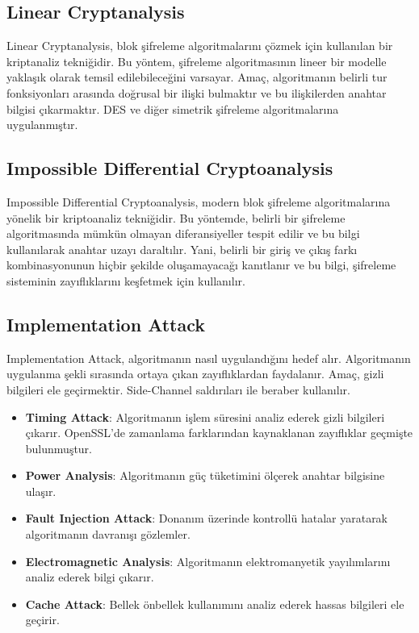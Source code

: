 \newpage

\subsection{Linear Cryptanalysis}

Linear Cryptanalysis, blok şifreleme algoritmalarını çözmek için kullanılan bir kriptanaliz tekniğidir. Bu yöntem, şifreleme algoritmasının lineer bir modelle yaklaşık olarak temsil edilebileceğini varsayar. Amaç, algoritmanın belirli tur fonksiyonları arasında doğrusal bir ilişki bulmaktır ve bu ilişkilerden anahtar bilgisi çıkarmaktır. DES ve diğer simetrik şifreleme algoritmalarına uygulanmıştır.

\newpage

\subsection{Impossible Differential Cryptoanalysis}

Impossible Differential Cryptoanalysis, modern blok şifreleme algoritmalarına yönelik bir kriptoanaliz tekniğidir. Bu yöntemde, belirli bir şifreleme algoritmasında mümkün olmayan diferansiyeller tespit edilir ve bu bilgi kullanılarak anahtar uzayı daraltılır. Yani, belirli bir giriş ve çıkış farkı kombinasyonunun hiçbir şekilde oluşamayacağı kanıtlanır ve bu bilgi, şifreleme sisteminin zayıflıklarını keşfetmek için kullanılır.

\newpage

\subsection{Implementation Attack}

Implementation Attack, algoritmanın nasıl uygulandığını hedef alır. Algoritmanın uygulanma şekli sırasında ortaya çıkan zayıflıklardan faydalanır. Amaç, gizli bilgileri ele geçirmektir. Side-Channel saldırıları ile beraber kullanılır. 

\begin{itemize}
    \item \textbf{Timing Attack}: Algoritmanın işlem süresini analiz ederek gizli bilgileri çıkarır. OpenSSL'de zamanlama farklarından kaynaklanan zayıflıklar geçmişte bulunmuştur.
    \item \textbf{Power Analysis}: Algoritmanın güç tüketimini ölçerek anahtar bilgisine ulaşır.
    \item \textbf{Fault Injection Attack}: Donanım üzerinde kontrollü hatalar yaratarak algoritmanın davranışı gözlemler.
    \item \textbf{Electromagnetic Analysis}: Algoritmanın elektromanyetik yayılımlarını analiz ederek bilgi çıkarır.
    \item \textbf{Cache Attack}: Bellek önbellek kullanımını analiz ederek hassas bilgileri ele geçirir.
\end{itemize}

